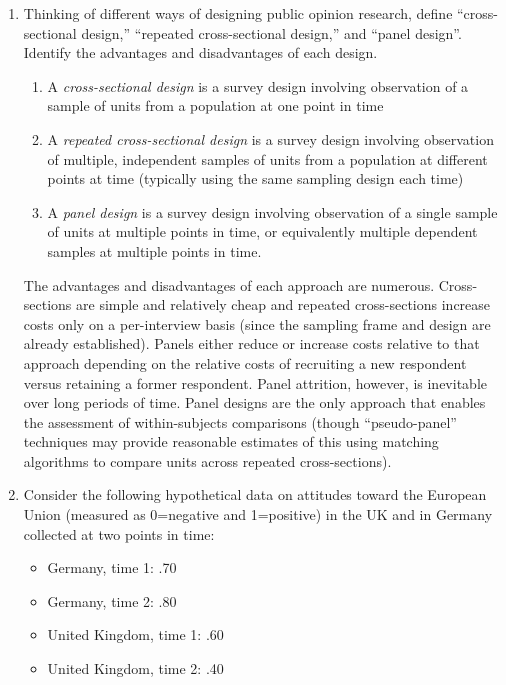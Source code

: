 \documentclass[a4paper]{exam}
\begin{document}
\begin{enumerate}
\item  Thinking of different ways of designing public opinion research,  define ``cross-sectional design,'' ``repeated cross-sectional  design,'' and ``panel design''. Identify the advantages and disadvantages of each design.

\begin{solution}

\begin{enumerate}
\item A \textit{cross-sectional design} is a survey design involving observation of a sample of units from a population at one point in time
\item A \textit{repeated cross-sectional design} is a survey design involving observation of multiple, independent samples of units from a population at different points at time (typically using the same sampling design each time)
\item A \textit{panel design} is a survey design involving observation of a single sample of units at multiple points in time, or equivalently multiple dependent samples at multiple points in time.
\end{enumerate}

The advantages and disadvantages of each approach are numerous. Cross-sections are simple and relatively cheap and repeated cross-sections increase costs only on a per-interview basis (since the sampling frame and design are already established). Panels either reduce or increase costs relative to that approach depending on the relative costs of recruiting a new respondent versus retaining a former respondent. Panel attrition, however, is inevitable over long periods of time. Panel designs are the only approach that enables the assessment of within-subjects comparisons (though ``pseudo-panel'' techniques may provide reasonable estimates of this using matching algorithms to compare units across repeated cross-sections).

\end{solution}

\item Consider the following hypothetical data on attitudes toward the European Union (measured as 0=negative and 1=positive) in the UK and in Germany collected at two points in time:

	\begin{itemize}
	\item Germany, time 1: .70
	\item Germany, time 2: .80
	\item United Kingdom, time 1: .60
	\item United Kingdom, time 2: .40
	\end{itemize}


\end{enumerate}
\end{document}
